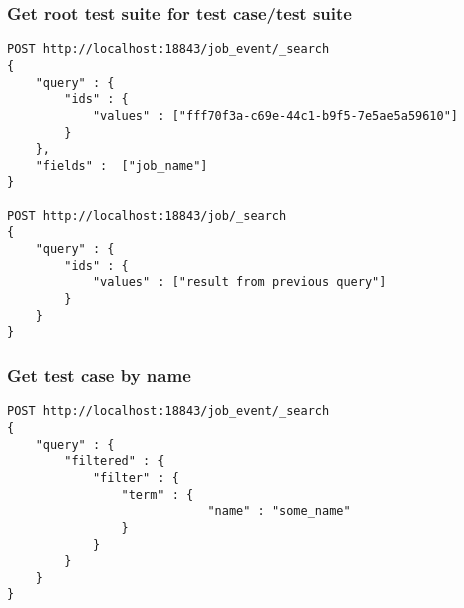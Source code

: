 \subsubsection*{Get root test suite for test case/test suite}
\label{q:getroottsEs}
\begin{verbatim}
POST http://localhost:18843/job_event/_search
{ 
    "query" : {
        "ids" : { 
            "values" : ["fff70f3a-c69e-44c1-b9f5-7e5ae5a59610"]
        }
    },
    "fields" :  ["job_name"]
}

POST http://localhost:18843/job/_search
{ 
    "query" : {
        "ids" : { 
            "values" : ["result from previous query"]
        }
    }
}
\end{verbatim}

\subsubsection*{Get test case by name}
\label{q:gettcbynameEs}
\begin{verbatim}
POST http://localhost:18843/job_event/_search
{
    "query" : {
        "filtered" : {
            "filter" : {
                "term" : {
                            "name" : "some_name"
                }
            }
        }
    }
}
\end{verbatim}